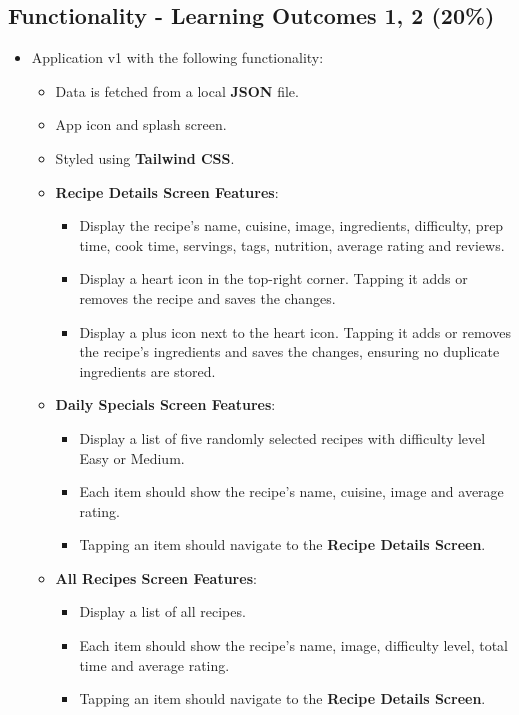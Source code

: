 \documentclass{article}
\begin{document}
\subsection*{Functionality - Learning Outcomes 1, 2 (20\%)}
\begin{itemize}
	 \item Application v1 with the following functionality:
   \begin{itemize}
    \item Data is fetched from a local \textbf{JSON} file.
    \item App icon and splash screen.
    \item Styled using \textbf{Tailwind CSS}.

    \item \textbf{Recipe Details Screen Features}:
    \begin{itemize}
      \item Display the recipe's name, cuisine, image, ingredients, difficulty, prep time, cook time, servings, tags, nutrition, average rating and reviews.
      \item Display a heart icon in the top-right corner. Tapping it adds or removes the recipe and saves the changes.
      \item Display a plus icon next to the heart icon. Tapping it adds or removes the recipe's ingredients and saves the changes, ensuring no duplicate ingredients are stored.
    \end{itemize}

    \item \textbf{Daily Specials Screen Features}:
    \begin{itemize}
      \item Display a list of five randomly selected recipes with difficulty level Easy or Medium.
      \item Each item should show the recipe's name, cuisine, image and average rating.
      \item Tapping an item should navigate to the \textbf{Recipe Details Screen}.
    \end{itemize}

    \item \textbf{All Recipes Screen Features}:
    \begin{itemize}
      \item Display a list of all recipes.
      \item Each item should show the recipe's name, image, difficulty level, total time and average rating.
      \item Tapping an item should navigate to the \textbf{Recipe Details Screen}.
    \end{itemize}


\end{itemize}
\end{itemize}
\end{document}
